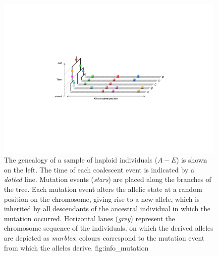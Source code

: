 

\begin{figure}[!htb]
\centering
\includegraphics[width=\textwidth]{./img/ch1/info_mutation}
{The genealogy of a sample of  haploid individuals ($A-E$) is shown on the left.
The time of each coalescent event is indicated by a \emph{dotted} line.
Mutation events (\emph{stars}) are placed along the branches of the tree.
Each mutation event alters the allelic state at a random position on the chromosome, giving rise to a new allele, which is inherited by all descendants of the ancestral individual in which the mutation occurred.
Horizontal lanes (\emph{grey}) represent the chromosome sequence of the individuals, on which the derived alleles are depicted as \emph{marbles}; colours correspond to the mutation event from which the alleles derive.}
{fig:info_mutation}
\end{figure}
